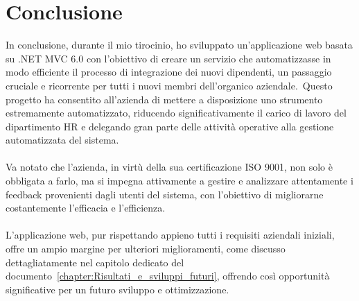 \chapter*{Conclusione} %
%
In conclusione, durante il mio tirocinio, ho sviluppato un'applicazione web basata su .NET MVC 6.0 con 
l'obiettivo di creare un servizio che automatizzasse in modo efficiente il 
processo di integrazione dei nuovi dipendenti, un passaggio cruciale e ricorrente per 
tutti i nuovi membri dell'organico aziendale.\ Questo progetto ha consentito 
all'azienda di mettere a disposizione uno strumento estremamente automatizzato, riducendo 
significativamente il carico di lavoro del dipartimento HR e delegando gran parte delle 
attività operative alla gestione automatizzata del sistema.
%
%
\\ \\
Va notato che l'azienda, in virtù della sua certificazione ISO 9001, non solo è obbligata a farlo, 
ma si impegna attivamente a gestire e analizzare attentamente i feedback provenienti dagli utenti del sistema, 
con l'obiettivo di migliorarne costantemente l'efficacia e l'efficienza.
\\ \\
L'applicazione web, pur rispettando appieno tutti i requisiti aziendali iniziali, 
offre un ampio margine per ulteriori miglioramenti, come discusso dettagliatamente nel capitolo dedicato del documento~\ref{chapter:Risultati_e_sviluppi_futuri}, 
offrendo così opportunità significative per un futuro sviluppo e ottimizzazione.
